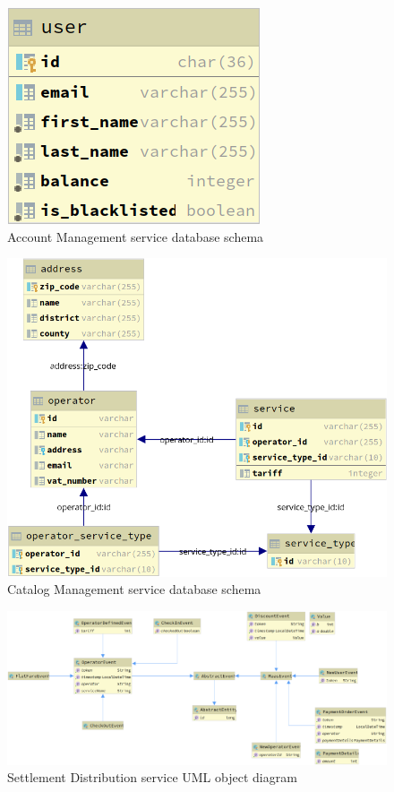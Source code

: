 \documentclass[runningheads,a4]{llncs}
\begin{document}
\begin{figure}
  \centering
  \includegraphics{img/sql-account-ws.png}
  \caption{Account Management service database schema}
  \label{fig:sql.account-ws}
\end{figure}
\begin{figure}
  \centering
  \includegraphics{img/sql-catalog-ws.png}
  \caption{Catalog Management service database schema}
  \label{fig:sql.catalog-ws}
\end{figure}
\begin{figure}
  \centering
  \includegraphics[width=\textwidth]{img/uml-settlement-ws.png}
  \caption{Settlement Distribution service \acs{UML} object diagram}
  \label{fig:uml.settlement-ws}
\end{figure}
\end{document}
